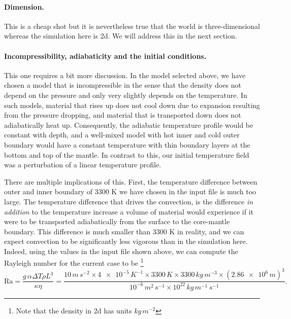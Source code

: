 \documentclass{article}
\begin{document}
\paragraph{Dimension.} This is a cheap shot but it is nevertheless true that the
world is three-dimensional whereas the simulation here is 2d. We will address
this in the next section.

\paragraph{Incompressibility, adiabaticity and the initial conditions.} This one
requires a bit more discussion. In the model selected above, we have chosen a
model that is incompressible in the sense that the density does not depend on
the pressure and only very slightly depends on the temperature. 
In such models, material that rises up does not cool down due to
expansion resulting from the pressure dropping, and material that is transported
down does not adiabatically heat up. Consequently, the adiabatic temperature
profile would be constant with depth, and a well-mixed model with hot inner and
cold outer boundary would have a constant temperature with thin boundary layers
at the bottom and top of the mantle. In contrast to this, our initial
temperature field was a perturbation of a linear temperature profile.

There are multiple implications of this. First, the temperature difference
between outer and inner boundary of 3300 K we have chosen in the input file is
much too large. The temperature difference that drives the convection, 
is the difference \textit{in addition} to the temperature increase a volume of 
material would experience if it were to be
transported adiabatically from the surface to the core-mantle boundary. This
difference is much smaller than 3300 K in reality, and we can expect convection
to be significantly less vigorous than in the simulation here. Indeed, using
the values in the input file shown above, we can compute the Rayleigh number for
the current case to be%
\footnote{Note that the density in 2d has units $\si{kg}\,\si{m}^{-2}$}
\begin{equation*}
  \textrm{Ra}
  =
  \frac{g\, \alpha  \Delta T  \rho  L^3}{\kappa\eta}
=
  \frac{10\, \si{m}\,\si{s}^{-2} \times \num{4e-5}\, \si{K}^{-1} \times 3300\,
  \si{K} \times 3300\, \si{kg}\,\si{m}^{-3} \times (\num{2.86e6}
  \, \si{m})^3}{10^{-6}\, \si{m}^2\,\si{s}^{-1}\times 10^{22}\,
  \si{kg}\,\si{m}^{-1}\,\si{s}^{-1}}.
\end{equation*}
\end{document}
